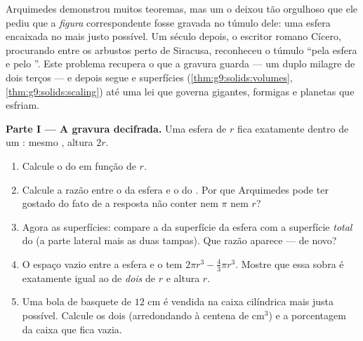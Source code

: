 \begin{problem}
\label{pb:g9:solids:1}
Arquimedes demonstrou muitos teoremas, mas um o deixou tão orgulhoso
que ele pediu que a \emph{figura} correspondente fosse gravada no
túmulo dele: uma esfera encaixada no  mais justo possível. Um
século depois, o escritor romano Cícero, procurando entre os arbustos
perto de Siracusa, reconheceu o túmulo ``pela esfera e pelo ''.
Este problema recupera o que a gravura guarda --- um duplo milagre de
dois terços --- e depois segue  e superfícies
(\cref{thm:g9:solids:volumes}, \cref{thm:g9:solids:scaling}) até uma
lei que governa gigantes, formigas e planetas que esfriam.

\medskip
\noindent\textbf{Parte I --- A gravura decifrada.}
Uma esfera de  $r$ fica exatamente dentro de um : mesmo
, altura $2r$.
\begin{enumerate}
  \item Calcule o  do  em função de $r$.
  \item Calcule a razão entre o  da esfera e o do . Por
        que Arquimedes pode ter gostado do fato de a resposta não
        conter nem $\pi$ nem $r$?
  \item Agora as superfícies: compare a  da superfície da esfera
        com a superfície \emph{total} do  (a parte lateral mais
        as duas tampas). Que razão aparece --- de novo?
  \item O espaço vazio entre a esfera e o  tem 
        $2\pi r^3 - \frac43\pi r^3$. Mostre que essa sobra é exatamente
        igual ao  de \emph{dois } de  $r$ e altura $r$.
  \item Uma bola de basquete de  $12$ cm é vendida na caixa
        cilíndrica mais justa possível. Calcule os dois 
        (arredondando à centena de cm$^3$) e a porcentagem da caixa que
        fica vazia.
\end{enumerate}


\end{problem}
